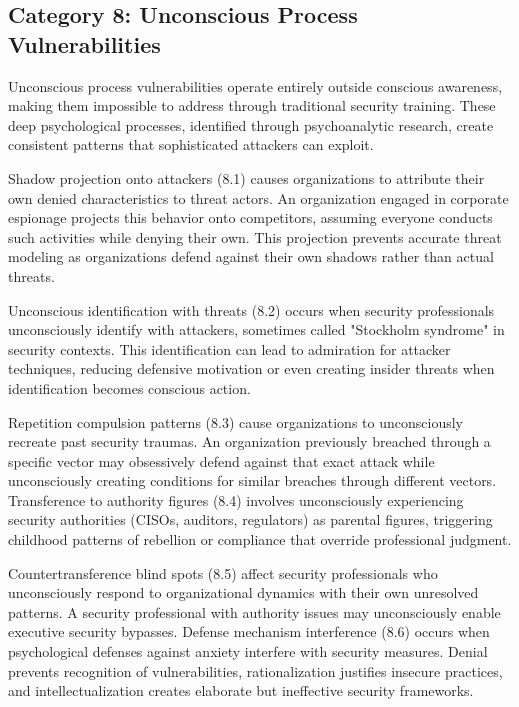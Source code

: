 \documentclass[manuscript,screen,review]{acmart}
\begin{document}
\subsection{Category 8: Unconscious Process Vulnerabilities}

Unconscious process vulnerabilities operate entirely outside conscious awareness, making them impossible to address through traditional security training. These deep psychological processes, identified through psychoanalytic research, create consistent patterns that sophisticated attackers can exploit.

Shadow projection onto attackers (8.1) causes organizations to attribute their own denied characteristics to threat actors. An organization engaged in corporate espionage projects this behavior onto competitors, assuming everyone conducts such activities while denying their own. This projection prevents accurate threat modeling as organizations defend against their own shadows rather than actual threats.

Unconscious identification with threats (8.2) occurs when security professionals unconsciously identify with attackers, sometimes called "Stockholm syndrome" in security contexts. This identification can lead to admiration for attacker techniques, reducing defensive motivation or even creating insider threats when identification becomes conscious action.

Repetition compulsion patterns (8.3) cause organizations to unconsciously recreate past security traumas. An organization previously breached through a specific vector may obsessively defend against that exact attack while unconsciously creating conditions for similar breaches through different vectors. Transference to authority figures (8.4) involves unconsciously experiencing security authorities (CISOs, auditors, regulators) as parental figures, triggering childhood patterns of rebellion or compliance that override professional judgment.

Countertransference blind spots (8.5) affect security professionals who unconsciously respond to organizational dynamics with their own unresolved patterns. A security professional with authority issues may unconsciously enable executive security bypasses. Defense mechanism interference (8.6) occurs when psychological defenses against anxiety interfere with security measures. Denial prevents recognition of vulnerabilities, rationalization justifies insecure practices, and intellectualization creates elaborate but ineffective security frameworks.
\end{document}
